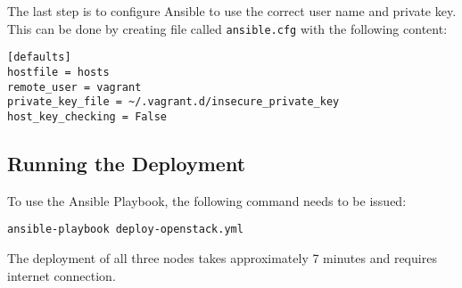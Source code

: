 The last step is to configure Ansible to use the correct user name and private key. This can be done by creating file called \texttt{ansible.cfg} with the following content:

\begin{lstlisting}
[defaults]
hostfile = hosts
remote_user = vagrant
private_key_file = ~/.vagrant.d/insecure_private_key
host_key_checking = False
\end{lstlisting}

\subsection{Running the Deployment}

To use the Ansible Playbook, the following command needs to be issued:

\begin{lstlisting}
ansible-playbook deploy-openstack.yml
\end{lstlisting}

The deployment of all three nodes takes approximately 7 minutes and requires internet connection.
